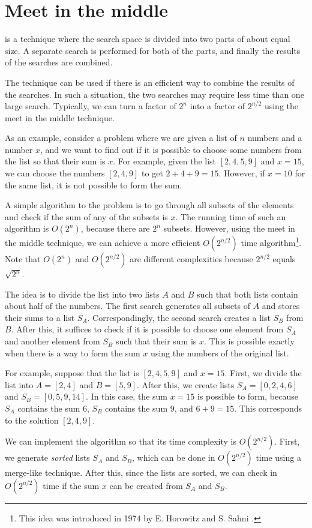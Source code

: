 \section{Meet in the middle}


 is a technique
where the search space is divided into
two parts of about equal size.
A separate search is performed
for both of the parts,
and finally the results of the searches are combined.

The technique can be used
if there is an efficient way to combine the
results of the searches.
In such a situation, the two searches may require less
time than one large search.
Typically, we can turn a factor of $2^n$
into a factor of $2^{n/2}$ using the meet in the
middle technique.

As an example, consider a problem where
we are given a list of $n$ numbers and
a number $x$,
and we want to find out if it is possible
to choose some numbers from the list so that
their sum is $x$.
For example, given the list $[2,4,5,9]$ and $x=15$,
we can choose the numbers $[2,4,9]$ to get $2+4+9=15$.
However, if $x=10$ for the same list,
it is not possible to form the sum.

A simple algorithm to the problem is to
go through all subsets of the elements and
check if the sum of any of the subsets is $x$.
The running time of such an algorithm is $O(2^n)$,
because there are $2^n$ subsets.
However, using the meet in the middle technique,
we can achieve a more efficient $O(2^{n/2})$ time algorithm\footnote{This
idea was introduced in 1974 by E. Horowitz and S. Sahni \cite{hor74}.}.
Note that $O(2^n)$ and $O(2^{n/2})$ are different
complexities because $2^{n/2}$ equals $\sqrt{2^n}$.

The idea is to divide the list into
two lists $A$ and $B$ such that both
lists contain about half of the numbers.
The first search generates all subsets
of $A$ and stores their sums to a list $S_A$.
Correspondingly, the second search creates
a list $S_B$ from $B$.
After this, it suffices to check if it is possible
to choose one element from $S_A$ and another
element from $S_B$ such that their sum is $x$.
This is possible exactly when there is a way to
form the sum $x$ using the numbers of the original list.

For example, suppose that the list is $[2,4,5,9]$ and $x=15$.
First, we divide the list into $A=[2,4]$ and $B=[5,9]$.
After this, we create lists
$S_A=[0,2,4,6]$ and $S_B=[0,5,9,14]$.
In this case, the sum $x=15$ is possible to form,
because $S_A$ contains the sum $6$,
$S_B$ contains the sum $9$, and $6+9=15$.
This corresponds to the solution $[2,4,9]$.

We can implement the algorithm so that
its time complexity is $O(2^{n/2})$.
First, we generate \emph{sorted} lists $S_A$ and $S_B$,
which can be done in $O(2^{n/2})$ time using a merge-like technique.
After this, since the lists are sorted,
we can check in $O(2^{n/2})$ time if
the sum $x$ can be created from $S_A$ and $S_B$.

